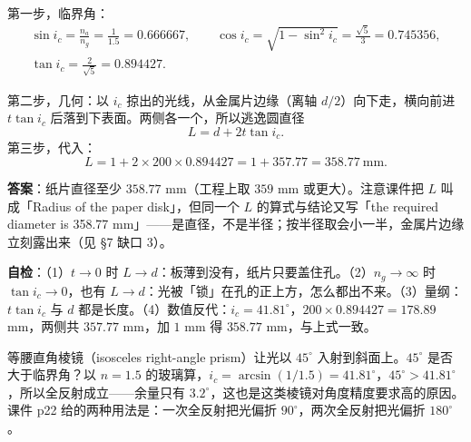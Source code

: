 \documentclass[11pt]{ctexart}
\begin{document}
第一步，临界角：
\begin{gather*}
\sin i_c=\frac{n_a}{n_g}=\frac{1}{1.5}=0.666667,\qquad
\cos i_c=\sqrt{1-\sin^2 i_c}=\frac{\sqrt5}{3}=0.745356,\\
\tan i_c=\frac{2}{\sqrt5}=0.894427 .
\end{gather*}

第二步，几何：以 $i_c$ 掠出的光线，从金属片边缘（离轴 $d/2$）向下走，横向前进 $t\tan i_c$ 后落到下表面。两侧各一个，所以逃逸圆直径
\[
L=d+2t\tan i_c .
\]
第三步，代入：
\[
L=1+2\times200\times0.894427=1+357.77=358.77\ \text{mm}.
\]


\textbf{答案}：纸片直径至少 $358.77$ mm（工程上取 $359$ mm 或更大）。注意课件把 $L$ 叫成「Radius of the paper disk」，但同一个 $L$ 的算式与结论又写「the required diameter is 358.77 mm」——是直径，不是半径；按半径取会小一半，金属片边缘立刻露出来（见 §7 缺口 3）。

\textbf{自检}：（1）$t\to0$ 时 $L\to d$：板薄到没有，纸片只要盖住孔。（2）$n_g\to\infty$ 时 $\tan i_c\to0$，也有 $L\to d$：光被「锁」在孔的正上方，怎么都出不来。（3）量纲：$t\tan i_c$ 与 $d$ 都是长度。（4）数值反代：$i_c=41.81^\circ$，$200\times0.894427=178.89$ mm，两侧共 $357.77$ mm，加 $1$ mm 得 $358.77$ mm，与上式一致。

等腰直角棱镜（isosceles right-angle prism）让光以 $45^\circ$ 入射到斜面上。$45^\circ$ 是否大于临界角？以 $n=1.5$ 的玻璃算，$i_c=\arcsin(1/1.5)=41.81^\circ$，$45^\circ>41.81^\circ$，所以全反射成立——余量只有 $3.2^\circ$，这也是这类棱镜对角度精度要求高的原因。课件 p22 给的两种用法是：一次全反射把光偏折 $90^\circ$，两次全反射把光偏折 $180^\circ$。
\end{document}
